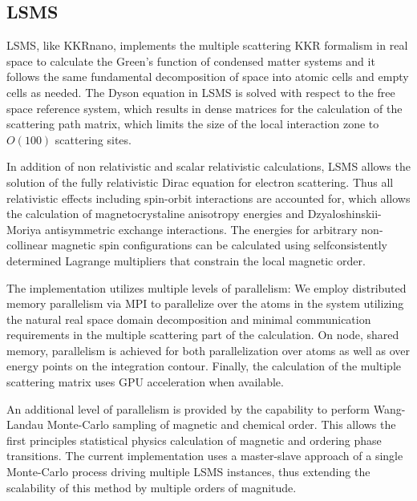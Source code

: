 \documentclass{llncs}
\def\KKRnano{{KKRnano}}
\def\LSMS{{LSMS}}
\begin{document}
\subsection{LSMS} \label{section:lsms}

\LSMS{}\cite{PhysRevLett.75.2867}, like \KKRnano{}, implements the multiple
scattering KKR formalism in real space to calculate the Green's
function of condensed matter systems and it follows the same
fundamental decomposition of space into atomic cells and empty cells
as needed. The Dyson equation in \LSMS{} is solved with respect to the
free space reference system, which results in dense matrices for the
calculation of the scattering path matrix, which limits the size of
the local interaction zone to $O(100)$ scattering sites.

In addition of non relativistic and scalar relativistic
calculations, \LSMS{} allows the solution of the fully relativistic
Dirac equation for electron scattering. Thus all relativistic effects
including spin-orbit interactions are accounted for, which allows the
calculation of magnetocrystaline anisotropy energies and
Dzyaloshinskii-Moriya antisymmetric exchange interactions. The
energies for arbitrary non-collinear magnetic spin configurations can
be calculated using selfconsistently determined Lagrange multipliers
that constrain the local magnetic order. 

The implementation utilizes multiple levels of parallelism: We employ
distributed memory parallelism via MPI to parallelize over the atoms
in the system utilizing the natural real space domain decomposition
and minimal communication requirements in the multiple scattering part
of the calculation. On node, shared memory, parallelism is achieved
for both parallelization over atoms as well as over energy points on
the integration contour. Finally, the calculation of the multiple
scattering matrix uses GPU acceleration when available.  

An additional level of parallelism is provided by the capability to
perform Wang-Landau Monte-Carlo sampling of magnetic and chemical
order. This allows the first principles statistical physics
calculation of magnetic and ordering phase transitions. The current
implementation uses a master-slave approach of a single Monte-Carlo
process driving multiple \LSMS{} instances, thus extending the
scalability of this method by multiple orders of magnitude.
\end{document}
